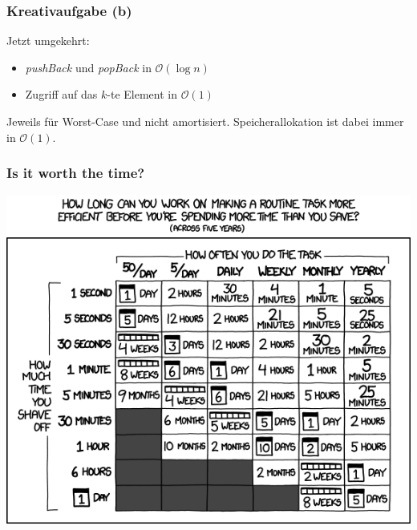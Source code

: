 \begin{frame}
	\frametitle{Kreativaufgabe (b)}
	Jetzt umgekehrt:

	\begin{itemize}
		\item \emph{pushBack} und \emph{popBack} in $\mathcal{O}(\log{n})$
		\item Zugriff auf das $k$-te Element in $\mathcal{O}(1)$
	\end{itemize}

	Jeweils für Worst-Case und nicht amortisiert.
	Speicherallokation ist dabei immer in $\mathcal{O}(1)$.
\end{frame}


\begin{frame}
	\frametitle{Is it worth the time?}
	\begin{center}
		\includegraphics[width=\textwidth,height=\textheight,keepaspectratio]{images/is_it_worth_the_time}
	\end{center}
\end{frame}


